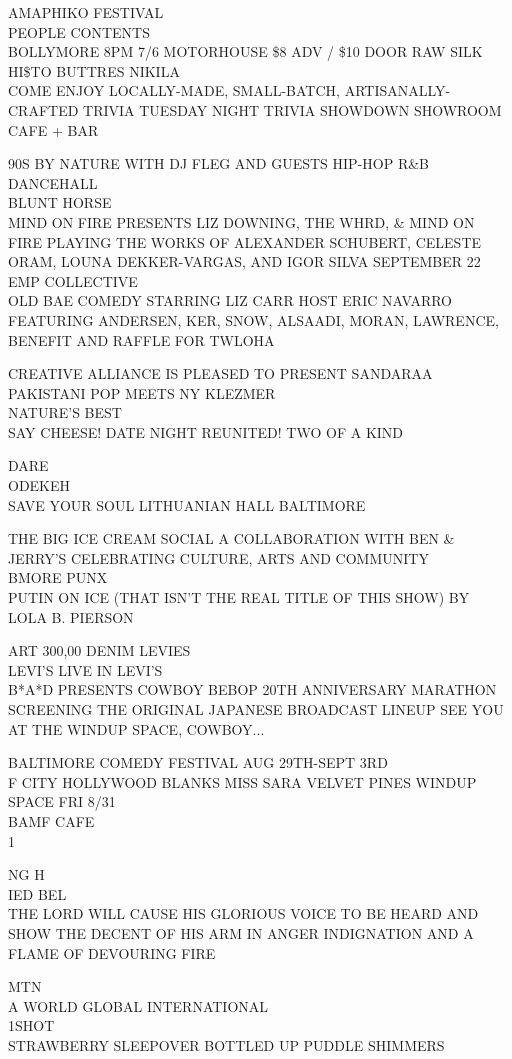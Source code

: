 \documentclass[10pt,letterpaper]{article}
\begin{document}
AMAPHIKO FESTIVAL\\
PEOPLE CONTENTS\\
BOLLYMORE 8PM 7/6 MOTORHOUSE \$8 ADV / \$10 DOOR RAW SILK HI\$TO BUTTRES NIKILA\\
COME ENJOY LOCALLY{-}MADE, SMALL{-}BATCH, ARTISANALLY{-}CRAFTED TRIVIA TUESDAY NIGHT TRIVIA SHOWDOWN SHOWROOM CAFE + BAR

90S BY NATURE WITH DJ FLEG AND GUESTS HIP{-}HOP R\&B DANCEHALL\\
BLUNT HORSE\\
MIND ON FIRE PRESENTS LIZ DOWNING, THE WHRD, \& MIND ON FIRE PLAYING THE WORKS OF ALEXANDER SCHUBERT, CELESTE ORAM, LOUNA DEKKER{-}VARGAS, AND IGOR SILVA SEPTEMBER 22 EMP COLLECTIVE\\
OLD BAE COMEDY STARRING LIZ CARR HOST ERIC NAVARRO FEATURING ANDERSEN, KER, SNOW, ALSAADI, MORAN, LAWRENCE, BENEFIT AND RAFFLE FOR TWLOHA

CREATIVE ALLIANCE IS PLEASED TO PRESENT SANDARAA PAKISTANI POP MEETS NY KLEZMER\\
NATURE'S BEST\\
SAY CHEESE!  DATE NIGHT  REUNITED!  TWO OF A KIND

DARE\\
ODEKEH\\
SAVE YOUR SOUL LITHUANIAN HALL BALTIMORE

THE BIG ICE CREAM SOCIAL A COLLABORATION WITH BEN \& JERRY'S CELEBRATING CULTURE, ARTS AND COMMUNITY\\
BMORE PUNX\\
PUTIN ON ICE (THAT ISN'T THE REAL TITLE OF THIS SHOW) BY LOLA B. PIERSON

ART 300,00 DENIM LEVIES\\
LEVI'S LIVE IN LEVI'S\\
B*A*D PRESENTS COWBOY BEBOP 20TH ANNIVERSARY MARATHON SCREENING THE ORIGINAL JAPANESE BROADCAST LINEUP SEE YOU AT THE WINDUP SPACE, COWBOY...

BALTIMORE COMEDY FESTIVAL AUG 29TH{-}SEPT 3RD\\
F CITY HOLLYWOOD BLANKS MISS SARA VELVET PINES WINDUP SPACE FRI 8/31\\
BAMF CAFE\\
1

NG H\\
IED BEL\\
THE LORD WILL CAUSE HIS GLORIOUS VOICE TO BE HEARD AND SHOW THE DECENT OF HIS ARM IN ANGER INDIGNATION AND A FLAME OF DEVOURING FIRE

MTN\\
A WORLD GLOBAL INTERNATIONAL\\
1SHOT\\
STRAWBERRY SLEEPOVER BOTTLED UP PUDDLE SHIMMERS
\end{document}
